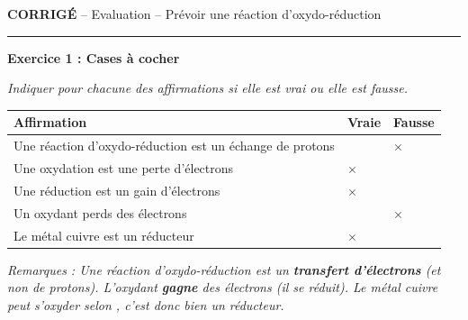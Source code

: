 \documentclass[11pt,a4paper]{article}
\renewcommand{\arraystretch}{2}
\newcommand{\rep}[1]{\textcolor{repcolor}{\textbf{#1}}}
\begin{document}
\begin{center}
\LARGE{\rep{CORRIGÉ} -- Evaluation -- Prévoir une réaction d'oxydo-réduction}\\[5mm]
\end{center}
\normalsize
\hrule
\vspace{8mm}

\textbf{Exercice 1 : Cases à cocher}

 \textit{Indiquer pour chacune des affirmations si elle est vrai ou elle est fausse.}\\[0.3cm]

\renewcommand{\arraystretch}{1.5}
\begin{center}
\begin{tabularx}{15cm}{|p{11cm}|X|X|}
    \hline
    Affirmation & Vraie & Fausse\\
    \hline
    Une réaction d'oxydo-réduction est un échange de protons
        & & \cellcolor{BrickRed!20}\rep{$\boldsymbol{\times}$}\\
    \hline
    Une oxydation est une perte d'électrons
        & \cellcolor{BrickRed!20}\rep{$\boldsymbol{\times}$} & \\
    \hline
    Une réduction est un gain d'électrons
        & \cellcolor{BrickRed!20}\rep{$\boldsymbol{\times}$} & \\
    \hline
    Un oxydant perds des électrons
        & & \cellcolor{BrickRed!20}\rep{$\boldsymbol{\times}$}\\
    \hline
    Le métal cuivre est un réducteur
        & \cellcolor{BrickRed!20}\rep{$\boldsymbol{\times}$} & \\
    \hline
\end{tabularx}
\end{center}

\noindent\textcolor{BrickRed!70}{\small\textit{%
Remarques : Une réaction d'oxydo-réduction est un \textbf{transfert d'électrons} (et non de protons).
L'oxydant \textbf{gagne} des électrons (il se réduit). Le métal cuivre peut s'oxyder selon
, c'est donc bien un réducteur.}}

\vfill
\end{document}
